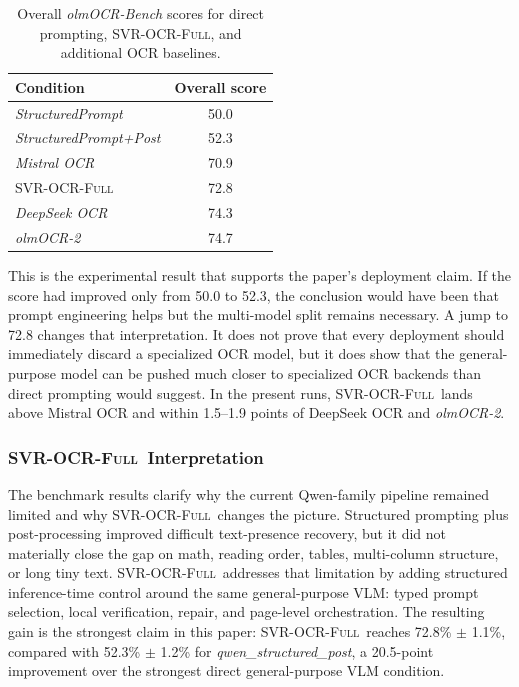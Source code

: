 \documentclass[conference]{IEEEtran}
\newcommand{\papername}[1]{\textit{#1}}
\newcommand{\svrocr}{\textsc{SVR-OCR-Full}}
\newcommand{\olmocr}{\papername{olmOCR-2}}
\begin{document}
\begin{table}[t]
\caption{Overall \papername{olmOCR-Bench} scores for direct prompting, \svrocr, and additional OCR baselines.}
\label{tab:svr-progression}
\centering
\footnotesize
\begin{tabular}{lc}
\toprule
Condition & Overall score \\
\midrule
\papername{StructuredPrompt} & 50.0 \\
\papername{StructuredPrompt+Post} & 52.3 \\
\papername{Mistral OCR} & 70.9 \\
\svrocr & 72.8 \\
\papername{DeepSeek OCR} & 74.3 \\
\olmocr & 74.7 \\
\bottomrule
\end{tabular}
\end{table}

This is the experimental result that supports the paper's deployment claim. If the score had improved only from 50.0 to 52.3, the conclusion would have been that prompt engineering helps but the multi-model split remains necessary. A jump to 72.8 changes that interpretation. It does not prove that every deployment should immediately discard a specialized OCR model, but it does show that the general-purpose model can be pushed much closer to specialized OCR backends than direct prompting would suggest. In the present runs, \svrocr\ lands above Mistral OCR and within 1.5--1.9 points of DeepSeek OCR and \olmocr.

\subsubsection{\svrocr\ Interpretation}

The benchmark results clarify why the current Qwen-family pipeline remained limited and why \svrocr\ changes the picture. Structured prompting plus post-processing improved difficult text-presence recovery, but it did not materially close the gap on math, reading order, tables, multi-column structure, or long tiny text. \svrocr\ addresses that limitation by adding structured inference-time control around the same general-purpose VLM: typed prompt selection, local verification, repair, and page-level orchestration. The resulting gain is the strongest claim in this paper: \svrocr\ reaches 72.8\% $\pm$ 1.1\%, compared with 52.3\% $\pm$ 1.2\% for \papername{qwen\_structured\_post}, a 20.5-point improvement over the strongest direct general-purpose VLM condition.
\end{document}
